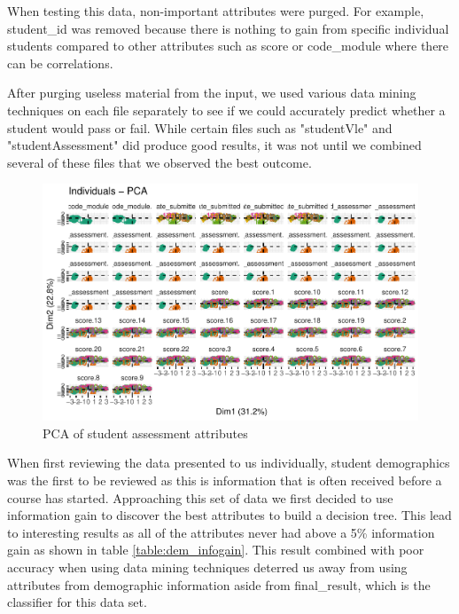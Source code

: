 \documentclass[12pt]{article}
\begin{document}
 When testing this data, non-important attributes were purged. For example, student\_id was removed because there is nothing to gain from specific individual students compared to other attributes such as score or code\_module where there can be correlations. 

 After purging useless material from the input, we used various data mining techniques on each file separately to see if we could accurately predict whether a student would pass or fail. While certain files such as "studentVle" and "studentAssessment" did produce good results, it was not until we combined several of these files that we observed the best outcome.  
 

\begin{figure}[h]
 \centering
 \includegraphics[scale=0.8]{PCA_Assessments_first50.pdf}
 \caption{PCA of student assessment attributes}
 \label{fig:pca}
 \end{figure}
 
 When first reviewing the data presented to us individually, student demographics was the first to be reviewed as this is information that is often received before a course has started. Approaching this set of data we first decided to use information gain to discover the best attributes to build a decision tree. This lead to interesting results as all of the attributes never had above a 5\% information gain as shown in table \ref{table:dem_infogain}. This result combined with poor accuracy when using data mining techniques deterred us away from using attributes from demographic information aside from final\_result, which is the classifier for this data set.
 
\end{document}
